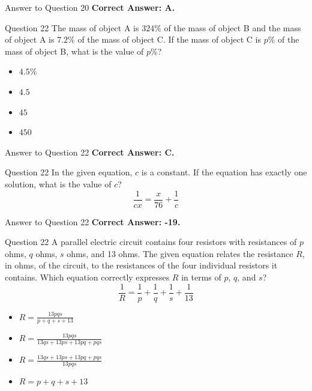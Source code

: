 \documentclass{beamer}
\begin{document}
\begin{frame}{Answer to Question 20}
\textbf{Correct Answer: A.}
\end{frame}

\begin{frame}{Question 22}
The mass of object A is $324\%$ of the mass of object B and the mass of object A is $7.2\%$ of the mass of object C.  
If the mass of object C is $p\%$ of the mass of object B, what is the value of $p\%$?
\begin{itemize}
    \item[A.] $4.5\%$
    \item[B.] $4.5$
    \item[C.] $45$
    \item[D.] $450$
\end{itemize}
\end{frame}

\begin{frame}{Answer to Question 22}
\textbf{Correct Answer: C.}
\end{frame}

\begin{frame}{Question 22}
In the given equation, $c$ is a constant. If the equation has exactly one solution, what is the value of $c$?
\[
\frac{1}{cx} = \frac{x}{76} + \frac{1}{c}
\]

\end{frame}

\begin{frame}{Answer to Question 22}
\textbf{Correct Answer: -19.}
\end{frame}

\begin{frame}{Question 22}
A parallel electric circuit contains four resistors with resistances of $p$ ohms, $q$ ohms, $s$ ohms, and 13 ohms. The given equation relates the resistance $R$, in ohms, of the circuit, to the resistances of the four individual resistors it contains. Which equation correctly expresses $R$ in terms of $p$, $q$, and $s$?
\[
\frac{1}{R} = \frac{1}{p} + \frac{1}{q} + \frac{1}{s} + \frac{1}{13}
\]
\begin{itemize}
    \item[A.] $R = \frac{13pqs}{p+q+s+13}$
    \item[B.] $R = \frac{13pqs}{13qs + 13ps + 13pq + pqs}$
    \item[C.] $R = \frac{13qs + 13ps + 13pq + pqs}{13pqs}$
    \item[D.] $R = p + q + s + 13$
\end{itemize}
\end{frame}
\end{document}
